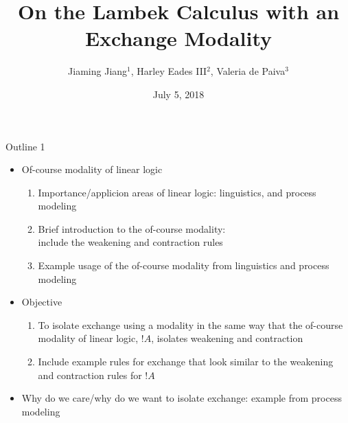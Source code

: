 \documentclass{beamer}
\title{On the Lambek Calculus with an Exchange Modality}
\subtitle{}
\date{July 5, 2018}
\author{Jiaming Jiang$^1$, Harley Eades III$^2$, Valeria de Paiva$^3$}
\institute{$^1$North Carolina State University; $^2$Augusta University; $^3$Nuance Communications}
\begin{document}
\maketitle


\begin{frame}{Outline 1}
\begin{itemize}
\item Of-course modality of linear logic
      \begin{enumerate}
      \item Importance/applicion areas of linear logic: linguistics, and
            process modeling
      \item Brief introduction to the of-course modality: \\
            include the weakening and contraction rules
      \item Example usage of the of-course modality from linguistics and
            process modeling
      \end{enumerate}
\item Objective
      \begin{enumerate}
      \item To isolate exchange using a modality in the same way that the
            of-course modality of linear logic, $!A$, isolates weakening
            and contraction
      \item Include example rules for exchange that look similar to the
            weakening and contraction rules for $!A$
      \end{enumerate}
\item Why do we care/why do we want to isolate exchange: example from
      process modeling
\end{itemize}
\end{frame}
\end{document}
